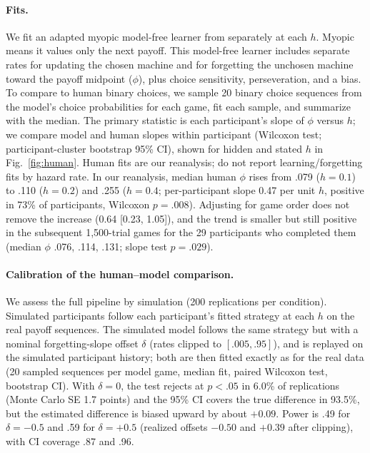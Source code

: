 \documentclass[letterpaper]{article} %
\begin{document}
\paragraph{Fits.} We fit an adapted myopic model-free learner from \citet{xiong2023neural} separately at each $h$. Myopic means it values only the next payoff. This model-free learner includes separate rates for updating the chosen machine and for forgetting the unchosen machine toward the payoff midpoint ($\phi$), plus choice sensitivity, perseveration, and a bias. To compare to human binary choices, we sample 20 binary choice sequences from the model's choice probabilities for each game, fit each sample, and summarize with the median. The primary statistic is each participant's slope of $\phi$ versus $h$; we compare model and human slopes within participant (Wilcoxon test; participant-cluster bootstrap 95\% CI), shown for hidden and stated $h$ in Fig.~\ref{fig:human}. Human fits are our reanalysis; \citet{xiong2023neural} do not report learning/forgetting fits by hazard rate. In our reanalysis, median human $\phi$ rises from .079 ($h=0.1$) to .110 ($h=0.2$) and .255 ($h=0.4$; per-participant slope 0.47 per unit $h$, positive in 73\% of participants, Wilcoxon $p=.008$). Adjusting for game order does not remove the increase (0.64 [0.23, 1.05]), and the trend is smaller but still positive in the subsequent 1{,}500-trial games for the 29 participants who completed them (median $\phi$ .076, .114, .131; slope test $p=.029$).

\paragraph{Calibration of the human--model comparison.} We assess the full pipeline by simulation (200 replications per condition). Simulated participants follow each participant's fitted strategy at each $h$ on the real payoff sequences. The simulated model follows the same strategy but with a nominal forgetting-slope offset $\delta$ (rates clipped to $[.005,.95]$), and is replayed on the simulated participant history; both are then fitted exactly as for the real data (20 sampled sequences per model game, median fit, paired Wilcoxon test, bootstrap CI). With $\delta=0$, the test rejects at $p<.05$ in 6.0\% of replications (Monte Carlo SE 1.7 points) and the 95\% CI covers the true difference in 93.5\%, but the estimated difference is biased upward by about $+0.09$. Power is .49 for $\delta=-0.5$ and .59 for $\delta=+0.5$ (realized offsets $-0.50$ and $+0.39$ after clipping), with CI coverage .87 and .96.
\end{document}
